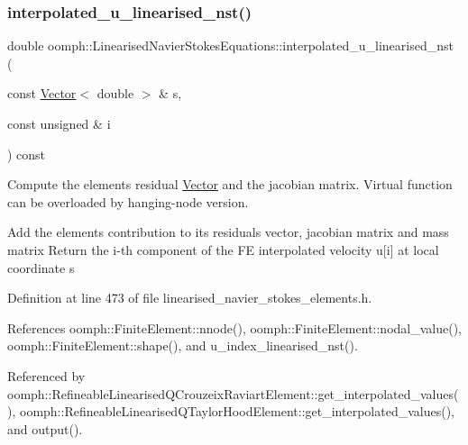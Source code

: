 \mbox{\label{classoomph_1_1LinearisedNavierStokesEquations_adbff2e60907cae4aa41f65f5d1d72998}} 
\subsubsection{\texorpdfstring{interpolated\+\_\+u\+\_\+linearised\+\_\+nst()}{interpolated\_u\_linearised\_nst()}}
{\footnotesize\ttfamily double oomph\+::\+Linearised\+Navier\+Stokes\+Equations\+::interpolated\+\_\+u\+\_\+linearised\+\_\+nst (\begin{DoxyParamCaption}\item[{const \hyperlink{classoomph_1_1Vector}{Vector}$<$ double $>$ \&}]{s,  }\item[{const unsigned \&}]{i }\end{DoxyParamCaption}) const\hspace{0.3cm}{\ttfamily [inline]}}



Compute the element\textquotesingle{}s residual \hyperlink{classoomph_1_1Vector}{Vector} and the jacobian matrix. Virtual function can be overloaded by hanging-\/node version. 

Add the element\textquotesingle{}s contribution to its residuals vector, jacobian matrix and mass matrix Return the i-\/th component of the FE interpolated velocity u\mbox{[}i\mbox{]} at local coordinate s 

Definition at line 473 of file linearised\+\_\+navier\+\_\+stokes\+\_\+elements.\+h.



References oomph\+::\+Finite\+Element\+::nnode(), oomph\+::\+Finite\+Element\+::nodal\+\_\+value(), oomph\+::\+Finite\+Element\+::shape(), and u\+\_\+index\+\_\+linearised\+\_\+nst().



Referenced by oomph\+::\+Refineable\+Linearised\+Q\+Crouzeix\+Raviart\+Element\+::get\+\_\+interpolated\+\_\+values(), oomph\+::\+Refineable\+Linearised\+Q\+Taylor\+Hood\+Element\+::get\+\_\+interpolated\+\_\+values(), and output().

